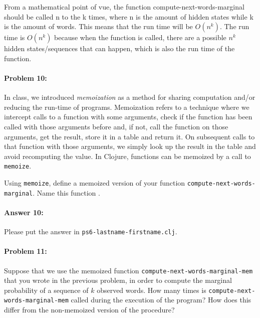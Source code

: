 \documentclass[10pt]{article}
\newenvironment{AnswerBox}{\begin{mdframed}[style=simple]}{\end{mdframed}}
\newcommand{\required}[1]{{\color{blue}{#1}}}
\newcommand{\PSnum}{6}
\begin{document}
\begin{AnswerBox}%

    From a mathematical point of vue, the function compute-next-words-marginal should be called n to the k times, where n is the amount of hidden states while k is the amount of words. This means that the run time will be $O(n^k)$. The run time is $O(n^k)$ because when the function is called, there are a possible $n^k$ hidden states/sequences that can happen, which is also the run time of the function.

\end{AnswerBox}%

\hrulefill%

\paragraph{Problem 10:}
In class, we introduced \emph{memoization} as a method for sharing
computation and/or reducing the run-time of programs. Memoization
refers to a technique where we intercept calls to a function with some
arguments, check if the function has been called with those arguments
before and, if not, call the function on those arguments, get the
result, store it in a table and return it. On subsequent calls to that
function with those arguments, we simply look up the result in the
table and avoid recomputing the value. In Clojure, functions can be
memoized by a call to \texttt{memoize}.

Using \texttt{memoize}, define a memoized version of your function
\texttt{compute-next-words-marginal}. Name this function
\required{\texttt{compute-next-words-marginal-mem}}.

\paragraph{Answer 10:} Please put the answer in
\texttt{ps\PSnum-lastname-firstname.clj}.

\hrulefill%

\paragraph{Problem 11:}
Suppose that we use the memoized function
\texttt{compute-next-words-marginal-mem} that you wrote in the
previous problem, in order to compute the marginal probability of a
sequence of $k$ observed words. How many times is
\texttt{compute-next-words-marginal-mem} called during the execution
of the program? How does this differ from the non-memoized version of
the procedure?
\end{document}
